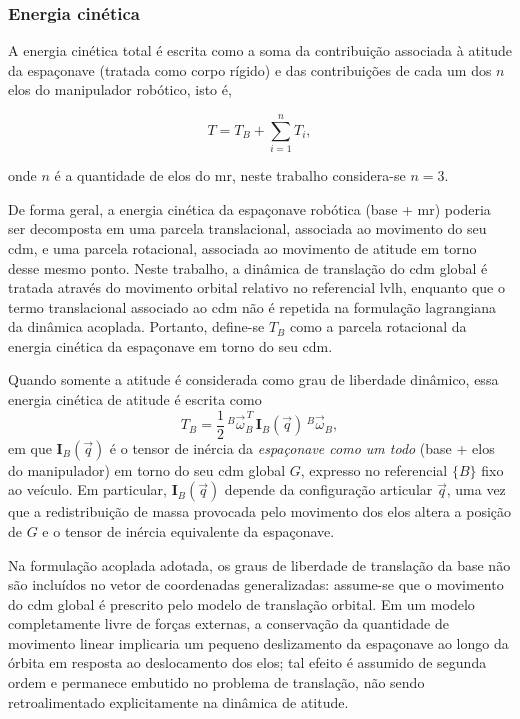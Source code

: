 \subsubsection{Energia cinética}
\label{sec:dinAcoplada_energia_cinetica}

A energia cinética total é escrita como a soma da contribuição associada à
atitude da espaçonave (tratada como corpo rígido) e das
contribuições de cada um dos $n$ elos do manipulador robótico, isto é,

\begin{equation}
T = T_{B} + \sum_{i=1}^{n} T_{i},
\label{eq:T_total}
\end{equation}

onde $n$ é a quantidade de elos do \gls{mr}, neste trabalho considera-se $n = 3$.

De forma geral, a energia cinética da espaçonave robótica (base + \gls{mr}) poderia ser decomposta em uma parcela translacional, associada ao movimento do seu \gls{cdm}, e uma parcela rotacional, associada ao movimento de atitude em torno desse mesmo ponto.
Neste trabalho, a dinâmica de translação do \gls{cdm} global é tratada através do movimento orbital relativo no referencial \gls{lvlh}, enquanto que o termo translacional associado ao \gls{cdm} não é repetida na formulação lagrangiana da dinâmica acoplada. Portanto, define-se $T_B$ como a parcela rotacional da energia cinética da espaçonave em torno do seu \gls{cdm}.

Quando somente a atitude é considerada como grau de liberdade dinâmico, essa
energia cinética de atitude é escrita como
\begin{equation}
T_{B} =
\frac{1}{2}\, {}^{B}\!\vec{\omega}_{B}^{\,T}\,\mathbf{I}_B(\vec{q})\,{}^{B}\!\vec{\omega}_{B},
\label{eq:TB}
\end{equation}
em que $\mathbf{I}_B(\vec{q})$ é o tensor de inércia da \emph{espaçonave como
um todo} (base + elos do manipulador) em torno do seu \gls{cdm} global
$G$, expresso no referencial $\{B\}$ fixo ao veículo. Em particular,
$\mathbf{I}_B(\vec{q})$ depende da configuração articular $\vec{q}$, uma vez
que a redistribuição de massa provocada pelo movimento dos elos altera a
posição de $G$ e o tensor de inércia equivalente da espaçonave.

Na formulação acoplada adotada, os graus de liberdade de translação da base
não são incluídos no vetor de coordenadas generalizadas: assume-se que o
movimento do \gls{cdm} global é prescrito pelo modelo de translação
orbital. Em um modelo completamente livre de forças externas, a conservação da
quantidade de movimento linear implicaria um pequeno deslizamento da
espaçonave ao longo da órbita em resposta ao deslocamento dos elos; tal efeito
é assumido de segunda ordem e permanece embutido no problema de translação, não
sendo retroalimentado explicitamente na dinâmica de atitude.

